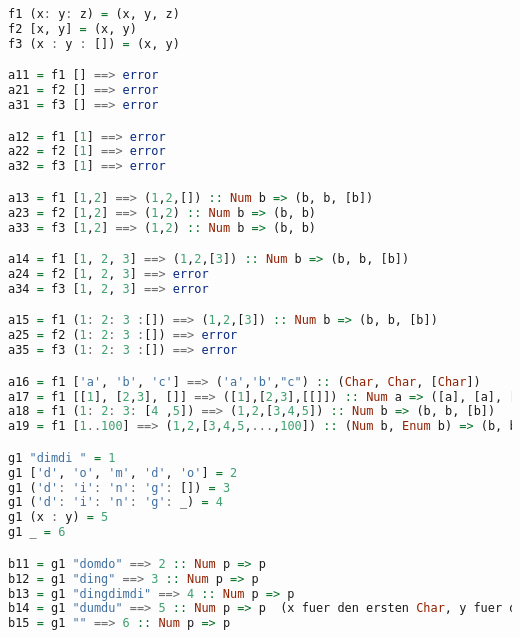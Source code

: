 \begin{lstlisting}[language=Haskell]
f1 (x: y: z) = (x, y, z)
f2 [x, y] = (x, y)
f3 (x : y : []) = (x, y)

a11 = f1 [] ==> error
a21 = f2 [] ==> error
a31 = f3 [] ==> error

a12 = f1 [1] ==> error
a22 = f2 [1] ==> error
a32 = f3 [1] ==> error

a13 = f1 [1,2] ==> (1,2,[]) :: Num b => (b, b, [b])
a23 = f2 [1,2] ==> (1,2) :: Num b => (b, b)
a33 = f3 [1,2] ==> (1,2) :: Num b => (b, b)

a14 = f1 [1, 2, 3] ==> (1,2,[3]) :: Num b => (b, b, [b])
a24 = f2 [1, 2, 3] ==> error
a34 = f3 [1, 2, 3] ==> error

a15 = f1 (1: 2: 3 :[]) ==> (1,2,[3]) :: Num b => (b, b, [b])
a25 = f2 (1: 2: 3 :[]) ==> error
a35 = f3 (1: 2: 3 :[]) ==> error

a16 = f1 ['a', 'b', 'c'] ==> ('a','b',"c") :: (Char, Char, [Char])
a17 = f1 [[1], [2,3], []] ==> ([1],[2,3],[[]]) :: Num a => ([a], [a], [[a]])
a18 = f1 (1: 2: 3: [4 ,5]) ==> (1,2,[3,4,5]) :: Num b => (b, b, [b])
a19 = f1 [1..100] ==> (1,2,[3,4,5,...,100]) :: (Num b, Enum b) => (b, b, [b])

g1 "dimdi " = 1
g1 ['d', 'o', 'm', 'd', 'o'] = 2
g1 ('d': 'i': 'n': 'g': []) = 3
g1 ('d': 'i': 'n': 'g': _) = 4
g1 (x : y) = 5
g1 _ = 6

b11 = g1 "domdo" ==> 2 :: Num p => p
b12 = g1 "ding" ==> 3 :: Num p => p
b13 = g1 "dingdimdi" ==> 4 :: Num p => p
b14 = g1 "dumdu" ==> 5 :: Num p => p  (x fuer den ersten Char, y fuer den Rest)
b15 = g1 "" ==> 6 :: Num p => p
\end{lstlisting}
